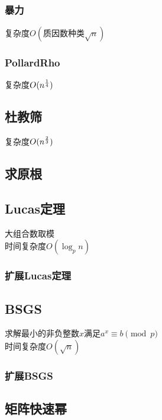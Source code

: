 \subsubsection{暴力}
复杂度$O(\text{质因数种类}\sqrt{n})$

\subsubsection{PollardRho}
复杂度$O(n^{1\over 4})$


\subsection{杜教筛}
复杂度$O(n^{2\over 3})$


\subsection{求原根}


\subsection{Lucas定理}
大组合数取模\\
时间复杂度$O(\log_{p}n)$\\

\subsubsection{扩展Lucas定理}


\subsection{BSGS}
求解最小的非负整数$x$满足$a^x \equiv b \pmod{p}$\\
时间复杂度$O(\sqrt n)$\\

\subsubsection{扩展BSGS}


\subsection{矩阵快速幂}


